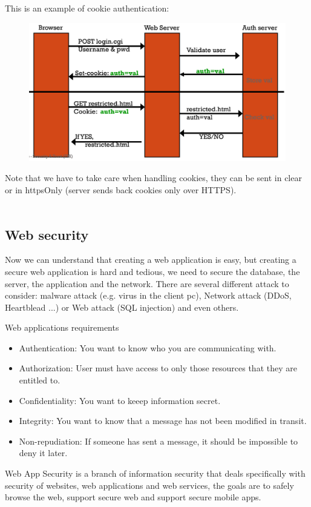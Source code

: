  This is an example of cookie authentication:
 \begin{figure}[h!]
     \centering
     \includegraphics[scale=0.35]{images/cookies.png}
 \end{figure}
 \FloatBarrier

 Note that we have to take care when handling cookies, they can be sent in clear or in httpsOnly (server sends back cookies only over HTTPS).
 \\\\
 \subsection{Web security}
 Now we can understand that creating a web application is easy, but creating a secure web application is hard and tedious, we need to secure the database, the server, the application and the network. There are several different attack to consider: malware attack (e.g. virus in the client pc), Network attack (DDoS, Heartblead ...) or Web attack (SQL injection) and even others.

Web applications requirements
\begin{itemize}
    \item Authentication: You want to know who you are communicating with.
    \item Authorization: User must have access to only those resources that they are entitled to.
    \item Confidentiality: You want to keeep information secret.
    \item Integrity: You want to know that a message has not been modified in transit.
    \item Non-repudiation: If someone has sent a message, it should be impossible to deny it later.
\end{itemize}
Web App Security is a branch of information security that deals specifically with security of websites, web applications and web services, the goals are to safely browse the web, support secure web and support secure mobile apps.

